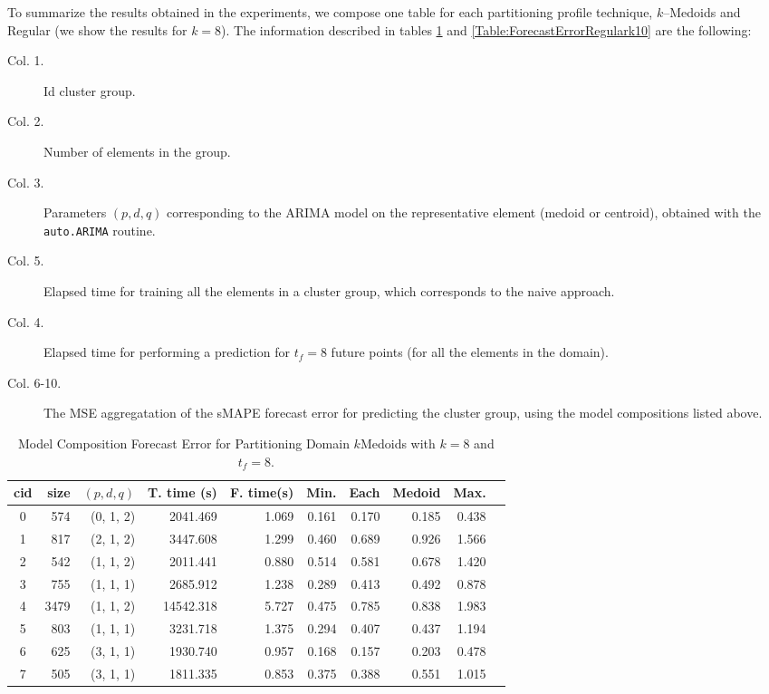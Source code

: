 To summarize the results obtained in the experiments, we compose one table for each partitioning profile technique, $k$--Medoids and Regular (we show the results for $k=8$). The information described in tables \ref{Table:ForecastErrorkMedoidsk8} and \ref{Table:ForecastErrorRegulark10} are the following:

\begin{description}
    \item[Col. 1.] Id cluster group.
    \item[Col. 2.] Number of elements in the group.
    \item[Col. 3.] Parameters $(p, d, q)$ corresponding to the ARIMA model on the representative element (medoid or centroid), obtained with the \texttt{auto.ARIMA} routine.
    \item[Col. 5.] Elapsed time for training all the elements in a cluster group, which corresponds to the naive approach.
    \item[Col. 4.] Elapsed time for performing a prediction for $t_{f}=8$ future points (for all the elements in the domain).
    \item[Col. 6-10.] The MSE aggregatation of the sMAPE forecast error for predicting the cluster group, using the model compositions listed above.
\end{description}

\begin{table}[h]
	\centering
	\small
	\begin{tabular}{|c|r|r|r|r|r|r|r|r|r|}
        \hline
        cid & size & $(p, d, q)$ & T. time (s) & F. time(s) & Min. & Each & \cellcolor{red!20}Medoid & Max. \\
        \hline
        0 &  574 & (0, 1, 2) &  2041.469   & 1.069   & 0.161  & 0.170  & \cellcolor{red!20}0.185 & 0.438  \\
        1 &  817 & (2, 1, 2) &  3447.608   & 1.299   & 0.460  & 0.689  & \cellcolor{red!20}0.926 & 1.566  \\
        2 &  542 & (1, 1, 2) &  2011.441   & 0.880   & 0.514  & 0.581  & \cellcolor{red!20}0.678 & 1.420  \\
        3 &  755 & (1, 1, 1) &  2685.912   & 1.238   & 0.289  & 0.413  & \cellcolor{red!20}0.492 & 0.878  \\
        4 & 3479 & (1, 1, 2) & 14542.318   & 5.727   & 0.475  & 0.785  & \cellcolor{red!20}0.838 & 1.983  \\
        5 &  803 & (1, 1, 1) &  3231.718   & 1.375   & 0.294  & 0.407  & \cellcolor{red!20}0.437 & 1.194  \\
        6 &  625 & (3, 1, 1) &  1930.740   & 0.957   & 0.168  & 0.157  & \cellcolor{red!20}0.203 & 0.478  \\
        7 &  505 & (3, 1, 1) &  1811.335   & 0.853   & 0.375  & 0.388  & \cellcolor{red!20}0.551 & 1.015  \\ \hline      
	\end{tabular}
	\caption{Model Composition Forecast Error for Partitioning Domain $k$Medoids with $k=8$ and $t_{f}=8$.}
	\label{Table:ForecastErrorkMedoidsk8}
\end{table}

